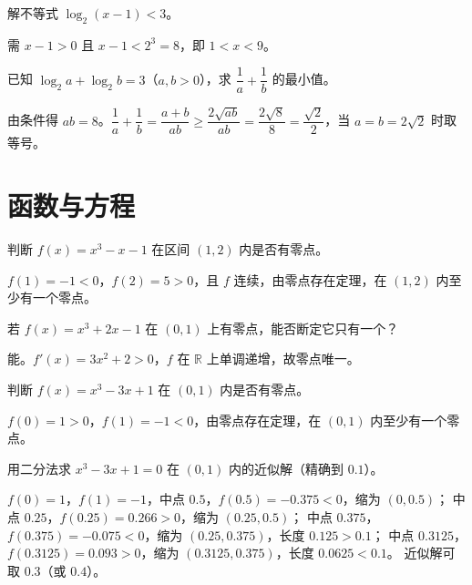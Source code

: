 \begin{problem}
解不等式 $\log_2(x-1)<3$。
\end{problem}
\begin{solution}
需 $x-1>0$ 且 $x-1<2^3=8$，即 $1<x<9$。
\end{solution}

\begin{problem}
已知 $\log_2 a+\log_2 b=3$（$a,b>0$），求 $\dfrac1a+\dfrac1b$ 的最小值。
\end{problem}
\begin{solution}
由条件得 $ab=8$。$\dfrac1a+\dfrac1b=\dfrac{a+b}{ab}\geq\dfrac{2\sqrt{ab}}{ab}
=\dfrac{2\sqrt8}{8}=\dfrac{\sqrt2}{2}$，当 $a=b=2\sqrt2$ 时取等号。
\end{solution}

\section{函数与方程}

\begin{problem}
判断 $f(x)=x^3-x-1$ 在区间 $(1,2)$ 内是否有零点。
\end{problem}
\begin{solution}
$f(1)=-1<0$，$f(2)=5>0$，且 $f$ 连续，由零点存在定理，在 $(1,2)$ 内至少有一个零点。
\end{solution}

\begin{problem}
若 $f(x)=x^3+2x-1$ 在 $(0,1)$ 上有零点，能否断定它只有一个？
\end{problem}
\begin{solution}
能。$f'(x)=3x^2+2>0$，$f$ 在 $\mathbb{R}$ 上单调递增，故零点唯一。
\end{solution}

\begin{problem}
判断 $f(x)=x^3-3x+1$ 在 $(0,1)$ 内是否有零点。
\end{problem}
\begin{solution}
$f(0)=1>0$，$f(1)=-1<0$，由零点存在定理，在 $(0,1)$ 内至少有一个零点。
\end{solution}

\begin{problem}
用二分法求 $x^3-3x+1=0$ 在 $(0,1)$ 内的近似解（精确到 $0.1$）。
\end{problem}
\begin{solution}
$f(0)=1$，$f(1)=-1$，中点 $0.5$，$f(0.5)=-0.375<0$，缩为 $(0,0.5)$；
中点 $0.25$，$f(0.25)=0.266>0$，缩为 $(0.25,0.5)$；
中点 $0.375$，$f(0.375)=-0.075<0$，缩为 $(0.25,0.375)$，长度 $0.125>0.1$；
中点 $0.3125$，$f(0.3125)=0.093>0$，缩为 $(0.3125,0.375)$，长度 $0.0625<0.1$。
近似解可取 $0.3$（或 $0.4$）。
\end{solution}

